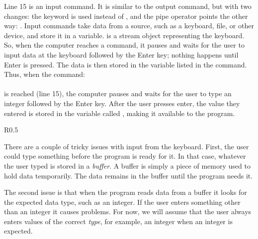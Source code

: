 Line 15 is an input command.  It is similar to the output command, but with two changes: the keyword  is used instead of , and the pipe operator points the other way: \cf{$>>$}.  Input commands take data from a source, such as a keyboard, file, or other device, and store it in a variable.    is a stream object representing the keyboard.  So, when the computer reaches a  command, it pauses and waits for the user to input data at the keyboard followed by the Enter key; nothing happens until Enter is pressed.  The data is then stored in the variable listed in the command.  Thus, when the command: \\
\\
is reached (line 15), the computer pauses and waits for the user to type an integer followed by the Enter key.  After the user presses enter, the value they entered is stored in the variable called , making it available to the program.  

\begin{wrapfigure}{R}{0.5\textwidth} \vspace{-0.3cm} 
\vspace{-0.5cm} 
\end{wrapfigure}

There are a couple of tricky issues with input from the keyboard.  First, the user could type something before the program is ready for it.  In that case, whatever the user typed is stored in a \emph{buffer}.  A buffer is simply a piece of memory used to hold data temporarily.  The data remains in the buffer until the program needs it.  

The second issue is that when the program reads data from a buffer it looks for the expected data type, such as an integer.  If the user enters something other than an integer it causes problems.  For now, we will assume that the user always enters values of the correct \emph{type}, for example, an integer when an integer is expected.

